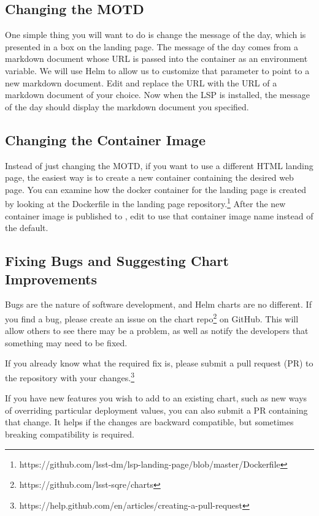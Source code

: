 \documentclass[11pt,twoside]{article}
\begin{document}
\subsection{Changing the MOTD}

One simple thing you will want to do is change the message of the day,
which is presented in a box on the landing page. The message of the day
comes from a markdown document whose URL is passed into the container
as an environment variable.  We will use Helm to allow us to customize that parameter
to point to a new markdown document.  Edit 
and replace the  URL with the URL of a markdown document
of your choice. Now when the LSP is installed, the message of the day should display
the markdown document you specified.

\subsection{Changing the Container Image}

Instead of just changing the MOTD, if you want to use a different HTML landing page,
the easiest way is to create a new container containing the desired web page.  You can
examine how the docker container for the landing page is created by looking at the
Dockerfile in the landing page repository.\footnote{
https://github.com/lsst-dm/lsp-landing-page/blob/master/Dockerfile}
After the new container image is published to , edit
 to use that container image name instead of the default.

\subsection{Fixing Bugs and Suggesting Chart Improvements}

Bugs are the nature of software development, and Helm charts are no different.  If you
find a bug, please create an issue on the chart repo\footnote{https://github.com/lsst-sqre/charts}
on GitHub.  This will allow others to see there may be a problem, as well as notify the
developers that something may need to be fixed.

If you already know what the required fix is, please submit a pull request (PR)
to the repository with your changes.\footnote{
https://help.github.com/en/articles/creating-a-pull-request}

If you have new features you wish to add to an existing chart, such as new ways of overriding
particular deployment values, you can also submit a PR containing that change.  It helps
if the changes are backward compatible, but sometimes breaking compatibility is required.
\end{document}
